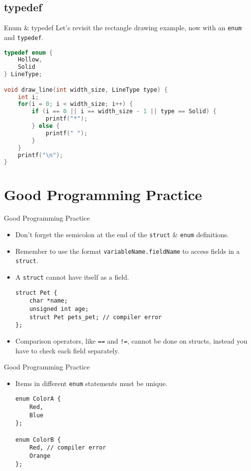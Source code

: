 \documentclass[graphics]{beamer}
\begin{document}
\subsection{typedef}
\begin{frame}[fragile]{Enum \& typedef}
    Let's revisit the rectangle drawing example, now with an \texttt{enum} and \texttt{typedef}.
    \begin{lstlisting}[language=C,basicstyle=\footnotesize,keywordstyle=\color{blue},commentstyle=\color{green},showstringspaces=false,stringstyle=\color{red}]
typedef enum {
    Hollow,
    Solid
} LineType;

void draw_line(int width_size, LineType type) {
    int i;
    for(i = 0; i < width_size; i++) {
        if (i == 0 || i == width_size - 1 || type == Solid) {
            printf("*");
        } else {
            printf(" ");
        }
    }
    printf("\n");
}
    \end{lstlisting}
\end{frame}

\section{Good Programming Practice}
\begin{frame}[fragile]{Good Programming Practice}
    \begin{itemize}
        \item Don't forget the semicolon at the end of the \texttt{struct} \& \texttt{enum} definitions.
        \item Remember to use the format \texttt{variableName.fieldName} to access fields in a \texttt{struct}.
        \item A \texttt{struct} cannot have itself as a field.
        \begin{verbatim}
struct Pet {
    char *name;
    unsigned int age;
    struct Pet pets_pet; // compiler error
};
        \end{verbatim}
        \item Comparison operators, like \texttt{==} and \texttt{!=}, cannot be done on structs, instead you have to check each field separately.
    \end{itemize}
\end{frame}

\begin{frame}[fragile]{Good Programming Practice}
    \begin{itemize}
        \item Items in different \texttt{enum} statements must be unique.
        \begin{verbatim}
enum ColorA {
    Red,
    Blue
};

enum ColorB {
    Red, // compiler error
    Orange
};
        \end{verbatim}
    \end{itemize}
\end{frame}
\end{document}
